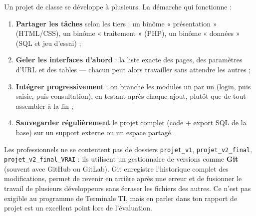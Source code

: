 \documentclass[11pt]{article}
\newcommand{\cle}[1]{{\popxbold\color{popdark}#1}}
\begin{document}
Un projet de classe se développe à plusieurs. La démarche qui fonctionne :
\begin{enumerate}
\item \textbf{Partager les tâches} selon les tiers : un binôme « présentation » (HTML/CSS), un binôme « traitement » (PHP), un binôme « données » (SQL et jeu d'essai) ;
\item \textbf{Geler les interfaces d'abord} : la liste exacte des pages, des paramètres d'URL et des tables — chacun peut alors travailler sans attendre les autres ;
\item \textbf{Intégrer progressivement} : on branche les modules un par un (login, puis saisie, puis consultation), en testant après chaque ajout, plutôt que de tout assembler à la fin ;
\item \textbf{Sauvegarder régulièrement} le projet complet (code + export SQL de la base) sur un support externe ou un espace partagé.
\end{enumerate}

\begin{savaistu}
Les professionnels ne se contentent pas de dossiers \texttt{projet\_v1}, \texttt{projet\_v2\_final}, \texttt{projet\_v2\_final\_VRAI} : ils utilisent un \cle{gestionnaire de versions} comme \textbf{Git} (souvent avec GitHub ou GitLab). Git enregistre l'historique complet des modifications, permet de revenir en arrière après une erreur et de fusionner le travail de plusieurs développeurs sans écraser les fichiers des autres. Ce n'est pas exigible au programme de Terminale TI, mais en parler dans ton rapport de projet est un excellent point lors de l'évaluation.
\end{savaistu}
\end{document}
